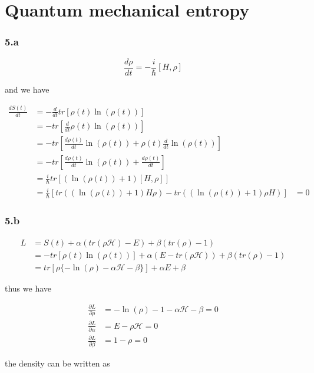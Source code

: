 \documentclass{article}
\begin{document}
\section*{Quantum mechanical entropy}
\subsubsection*{5.a}

$$
\frac{d\rho}{dt} = -\frac{i}{\hbar}[H, \rho]
$$

and we have

$$
\begin{aligned}
    \frac{dS(t)}{dt} &= -\frac{d}{dt} tr[\rho(t)\ln(\rho(t))]\\
    &=-tr[\frac{d}{dt} \rho(t) \ln(\rho(t))]\\
    &=-tr[\frac{d \rho(t)}{dt} \ln(\rho(t)) +  \rho(t) \frac{d}{dt}\ln(\rho(t))]\\
    &=-tr[\frac{d \rho(t)}{dt} \ln(\rho(t)) +  \frac{d \rho(t)}{dt}]\\
    &=\frac{i}{\hbar} tr[(\ln(\rho(t)) + 1)[H, \rho]]\\
    &=\frac{i}{\hbar} [tr((\ln(\rho(t)) + 1) H \rho) - tr((\ln(\rho(t)) + 1) \rho H)]
    &= 0
\end{aligned}
$$

\subsubsection*{5.b}

$$
\begin{aligned}
    L &= S(t) + \alpha (tr(\rho\mathcal{H}) - E) + \beta (tr(\rho) - 1)\\
    &= -tr[\rho(t)\ln(\rho(t))] + \alpha (E - tr(\rho\mathcal{H})) + \beta (tr(\rho) - 1)\\
    &= tr[\rho \{-\ln(\rho) - \alpha \mathcal{H} -\beta\}] + \alpha E + \beta
\end{aligned}
$$

thus we have

$$
\begin{aligned}
    \frac{\partial L}{\partial \rho} &= -\ln(\rho) - 1 - \alpha \mathcal{H} - \beta = 0\\
    \frac{\partial L}{\partial \alpha} &= E - \rho \mathcal{H} = 0\\
    \frac{\partial L}{\partial \beta} &= 1 - \rho = 0
\end{aligned}
$$

the density can be written as
\end{document}
